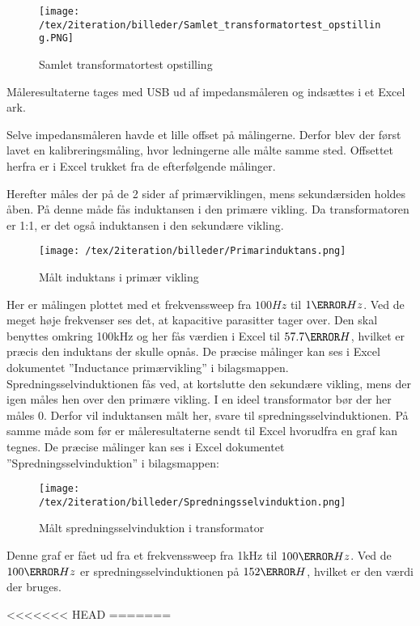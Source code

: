 \begin{figure}[H]
	\center
	\texttt{[image: /tex/2iteration/billeder/Samlet\_transformatortest\_opstilling.PNG]}
	\caption{Samlet transformatortest opstilling}
	\label{fig: Transopstilling}
\end{figure}

\noindent Måleresultaterne tages med USB ud af impedansmåleren og indsættes i et Excel ark.  

\noindent Selve impedansmåleren havde et lille offset på målingerne. Derfor blev der først lavet en kalibreringsmåling, hvor ledningerne alle målte samme sted. Offsettet herfra er i Excel trukket fra de efterfølgende målinger.    

\noindent Herefter måles der på de 2 sider af primærviklingen, mens sekundærsiden holdes åben. På denne måde fås induktansen i den primære vikling. Da transformatoren er 1:1, er det også induktansen i den sekundære vikling. 
\begin{figure}[H]
	\center
	\texttt{[image: /tex/2iteration/billeder/Primarinduktans.png]}
	\caption{Målt induktans i primær vikling}
	\label{fig: Primarinduktans}
\end{figure}
\noindent Her er målingen plottet med et frekvenssweep fra $100Hz$ til $1\mega Hz$. Ved de meget høje frekvenser ses det, at kapacitive parasitter tager over. Den skal benyttes omkring 100kHz og her fås værdien i Excel til $57.7\micro H$, hvilket er præcis den induktans der skulle opnås. De præcise målinger kan ses i Excel dokumentet ”Inductance primærvikling” i bilagsmappen. 
Spredningsselvinduktionen fås ved, at kortslutte den sekundære vikling, mens der igen måles hen over den primære vikling. I en ideel transformator bør der her måles 0. Derfor vil induktansen målt her, svare til spredningsselvinduktionen. På samme måde som før er måleresultaterne sendt til Excel hvorudfra en graf kan tegnes. De præcise målinger kan ses i Excel dokumentet ”Spredningsselvinduktion” i bilagsmappen:
\begin{figure}[H]
	\center
	\texttt{[image: /tex/2iteration/billeder/Spredningsselvinduktion.png]}
	\caption{Målt spredningsselvinduktion i transformator}
	\label{fig: leakageinductance}
\end{figure}
\noindent Denne graf er fået ud fra et frekvenssweep fra 1kHz til $100\kilo Hz$. Ved de $100\kilo Hz$ er spredningsselvinduktionen på $152\nano H$, hvilket er den værdi der bruges. 


<<<<<<< HEAD
=======

